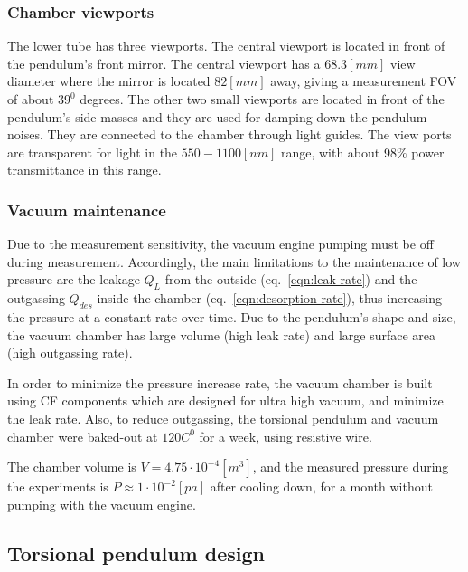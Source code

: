 \documentclass[\main/master.tex]{subfiles}
\begin{document}
\subsubsection{Chamber viewports}
\par\noindent
The lower tube has three viewports. The central viewport is located in front of the pendulum's front mirror. The central viewport has a $68.3 [mm]$ view diameter where the mirror is located $82 [mm]$ away, giving a measurement FOV of about $39^0$ degrees. The other two small viewports are located in front of the pendulum's side masses and they are used for damping down the pendulum noises. They are connected to the chamber through light guides. The view ports are transparent for light in the $550-1100 [nm]$ range, with about 98$\%$ power transmittance in this range. 
\subsubsection{Vacuum maintenance}
\par\noindent
Due to the measurement sensitivity, the vacuum engine pumping must be off during measurement. Accordingly, the main limitations to the maintenance of low pressure are the leakage $Q_L$ from the outside (eq.~\ref{eqn:leak rate}) and the outgassing $Q_{des}$ inside the chamber (eq.~\ref{eqn:desorption rate}), thus increasing the pressure at a constant rate over time. Due to the pendulum's shape and size, the vacuum chamber has large volume (high leak rate) and large surface area (high outgassing rate). 
\par\noindent
In order to minimize the pressure increase rate, the vacuum chamber is built using CF components which are designed for ultra high vacuum, and minimize the leak rate. Also, to reduce outgassing, the torsional pendulum and vacuum chamber were baked-out at $120 C^0$ for a week, using resistive wire. 
\par\noindent
The chamber volume is $V = 4.75\cdot 10^{-4}[m^3]$, and the measured pressure during the experiments is $P \approx 1\cdot 10^{−2} [pa]$ after cooling down, for a month without pumping with the vacuum engine.
\subsection{Torsional pendulum design}
 
\end{document}

